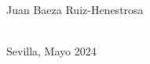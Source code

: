 \begin{titlepage}
\begin{minipage}{14cm}
\HRule \\[3.5cm]


{\Large

Juan Baeza Ruiz-Henestrosa} \\[0.5cm]

{\large
Sevilla, Mayo 2024
}

\end{minipage}

\vfill %

\cleardoublepage
\thispagestyle{empty}
\end{titlepage}

\raggedbottom

